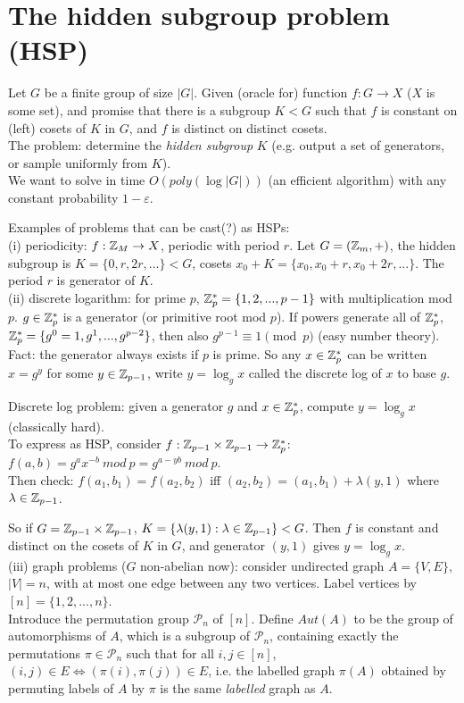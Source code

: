 \documentclass[a4paper]{article}
\begin{document}
\newpage

\section{The hidden subgroup problem (HSP)}

Let $G$ be a finite group of size $|G|$. Given (oracle for) function $f:G \to X$ ($X$ is some set), and promise that there is a subgroup $K < G$ such that $f$ is constant on (left) cosets of $K$ in $G$, and $f$ is distinct on distinct cosets.\\
The problem: determine the \emph{hidden subgroup} $K$ (e.g. output a set of generators, or sample uniformly from $K$).\\
We want to solve in time $O(poly(\log |G|))$ (an efficient algorithm) with any constant probability $1-\varepsilon$.

Examples of problems that can be cast(?) as HSPs:\\
(i) periodicity: $f:\mathbb{Z}_M \to X$, periodic with period $r$. Let $G=(\mathbb{Z}_m,+)$, the hidden subgroup is $K=\{0,r,2r,...\} < G$, cosets $x_0+K = \{x_0,x_0+r,x_0+2r,...\}$. The period $r$ is generator of $K$.\\
(ii) discrete logarithm: for prime $p$, $\mathbb{Z}_p^* = \{1,2,...,p-1\}$ with multiplication mod $p$. $g \in \mathbb{Z}_p^*$ is a generator (or primitive root mod $p$). If powers generate all of $\mathbb{Z}_p^*$, $\mathbb{Z}_p^* = \{g^0 = 1,g^1,...,g^{p-2}\}$, then also $g^{p-1} \equiv 1 \pmod p$ (easy number theory).\\
Fact: the generator always exists if $p$ is prime. So any $x \in \mathbb{Z}_p^*$ can be written $x = g^y$ for some $y \in \mathbb{Z}_{p-1}$, write $y=\log_g x$ called the discrete log of $x$ to base $g$.

Discrete log problem: given a generator $g$ and $x \in \mathbb{Z}^*_p$, compute $y=\log_g x$ (classically hard).\\
To express as HSP, consider $f:\mathbb{Z}_{p-1} \times \mathbb{Z}_{p-1} \to \mathbb{Z}_p^*$: $f(a,b) = g^a x^{-b} \ mod \ p = g^{a-yb} \ mod \ p$.\\
Then check: $f(a_1,b_1) = f(a_2,b_2)$ iff $(a_2,b_2) = (a_1,b_1)+\lambda(y,1)$ where $\lambda \in \mathbb{Z}_{p-1}$.

So if $G = \mathbb{Z}_{p-1} \times \mathbb{Z}_{p-1}$, $K=\{\lambda(y,1):\lambda \in \mathbb{Z}_{p-1}\} < G$. Then $f$ is constant and distinct on the cosets of $K$ in $G$, and generator $(y,1)$ gives $y=\log_g x$.\\

(iii) graph problems ($G$ non-abelian now): consider undirected graph $A = \{V,E\}$, $|V| =n$, with at most one edge between any two vertices. Label vertices by $[n] = \{1,2,...,n\}$.\\
Introduce the permutation group $\mathcal{P}_n$ of $[n]$. Define $Aut(A)$ to be the group of automorphisms of $A$, which is a subgroup of $\mathcal{P}_n$, containing exactly the permutations $\pi \in \mathcal{P}_n$ such that for all $i,j \in [n]$, $(i,j) \in E \iff (\pi(i),\pi(j)) \in E$, i.e. the labelled graph $\pi(A)$ obtained by permuting labels of $A$ by $\pi$ is the same \emph{labelled} graph as $A$.
\end{document}
